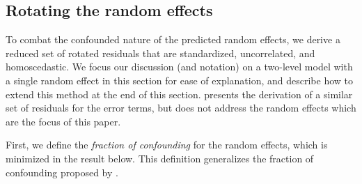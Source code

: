 \documentclass[12pt]{article} %
\newcommand{\al}[1]{{\color{red} #1}}
\newtheorem{definition}{Definition}
\newcommand{\trans}{\ensuremath{^\prime}}
\newcommand{\var}{\ensuremath{\mathrm{Var}}}
\begin{document}
\subsection{Rotating the random effects}\label{sec:rotate}

To combat \al{the confounded nature of the predicted random effects}, we derive a reduced set of rotated residuals that are standardized, uncorrelated, and homoscedastic. \al{We focus our discussion (and notation) on a two-level model with a single random effect in this section for ease of explanation, and describe how to extend this method at the end of this section.} \cite{HildenMinton:1995wh} presents the derivation of a similar set of residuals for the error terms, but does not address the random effects which are the focus of this paper. 

First, we define the \emph{fraction of confounding} for the random effects, which is minimized in the result below. This definition generalizes the fraction of confounding proposed by \cite{HildenMinton:1995wh}. \\

%

\end{document}
